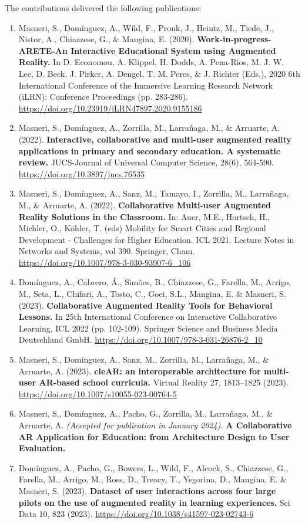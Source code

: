 The contributions delivered the following publications:
\begin{enumerate}[start=1,,ref=P\arabic*,label={\bfseries P\arabic*:}]
    \item Masneri, S., Domínguez, A., Wild, F., Pronk, J., Heintz, M., Tiede, J., Nistor, A., Chiazzese, G., \& Mangina, E. (2020). \textbf{Work-in-progress-ARETE-An Interactive Educational System using Augmented Reality.} In D. Economou, A. Klippel, H. Dodds, A. Pena-Rios, M. J. W. Lee, D. Beck, J. Pirker, A. Dengel, T. M. Peres, \& J. Richter (Eds.), 2020 6th International Conference of the Immersive Learning Research Network (iLRN): Conference Proceedings (pp. 283-286). \url{https://doi.org/10.23919/iLRN47897.2020.9155186} \label{pub:intro}
    \item Masneri, S., Domínguez, A., Zorrilla, M., Larrañaga, M., \& Arruarte, A. (2022). \textbf{Interactive, collaborative and multi-user augmented reality applications in primary and secondary education. A systematic review.} JUCS-Journal of Universal Computer Science, 28(6), 564-590. \url{https://doi.org/10.3897/jucs.76535} \label{pub:sota}
    \item Masneri, S., Domínguez, A., Sanz, M., Tamayo, I., Zorrilla, M., Larrañaga, M., \& Arruarte, A. (2022). \textbf{Collaborative Multi-user Augmented Reality Solutions in the Classroom.} In: Auer, M.E., Hortsch, H., Michler, O., Köhler, T. (eds) Mobility for Smart Cities and Regional Development - Challenges for Higher Education. ICL 2021. Lecture Notes in Networks and Systems, vol 390. Springer, Cham. \url{https://doi.org/10.1007/978-3-030-93907-6\_106} \label{pub:ork}
    \item Domínguez, A., Cabrero, Á., Simões, B., Chiazzese, G., Farella, M., Arrigo, M., Seta, L., Chifari, A., Tosto, C., Goei, S.L., Mangina, E. \& Masneri, S. (2023). \textbf{Collaborative Augmented Reality Tools for Behavioral Lessons.} In 25th International Conference on Interactive Collaborative Learning, ICL 2022 (pp. 102-109). Springer Science and Business Media Deutschland GmbH. \url{https://doi.org/10.1007/978-3-031-26876-2_10} \label{pub:beh}
    \item Masneri, S., Domínguez, A., Sanz, M., Zorrilla, M., Larrañaga, M., \& Arruarte, A. (2023). \textbf{cleAR: an interoperable architecture for multi-user AR-based school curricula.}  Virtual Reality 27, 1813–1825 (2023). \url{https://doi.org/10.1007/s10055-023-00764-5} \label{pub:arch}
    \item Masneri, S., Domínguez, A., Pacho, G., Zorrilla, M., Larrañaga, M., \& Arruarte, A. \textit{(Accepted for publication in January 2024).} \textbf{A Collaborative AR Application for Education: from Architecture Design to User Evaluation.} \label{pub:eval}
    \item Domínguez, A., Pacho, G., Bowers, L., Wild, F., Alcock, S., Chiazzese, G., Farella, M., Arrigo, M., Ross, D., Treacy, T., Yegorina, D., Mangina, E. \& Masneri, S. (2023). \textbf{Dataset of user interactions across four large pilots on the use of augmented reality in learning experiences.} Sci Data 10, 823 (2023). \url{https://doi.org/10.1038/s41597-023-02743-6} \label{pub:eval2}
\end{enumerate}

